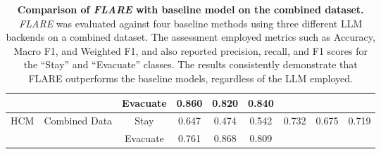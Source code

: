 \begin{table*}[t]
{\begin{tabular}{c|c|c|ccc|ccc}
&           & Evacuate & 0.860 & 0.820 & 0.840 &                     &                     &                     \\ 
\midrule
\multirow{2}{*}{HCM} 
& \multirow{2}{*}{Combined Data} 
  & Stay     & 0.647 & 0.474 & 0.542 & \multirow{2}{*}{0.732} & \multirow{2}{*}{0.675} & \multirow{2}{*}{0.719} \\
&           & Evacuate & 0.761 & 0.868 & 0.809 &                     &                     &                     \\ 
\bottomrule
\end{tabular}}
\caption{\textbf{Comparison of \emph{FLARE} with baseline model on the combined dataset.} \emph{FLARE} was evaluated against four baseline methods using three different LLM backends on a combined dataset. The assessment employed metrics such as Accuracy, Macro F1, and Weighted F1, and also reported precision, recall, and F1 scores for the “Stay” and “Evacuate” classes. The results consistently demonstrate that FLARE outperforms the baseline models, regardless of the LLM employed.}
\label{tab:same_results}
\vspace{-1em}
\end{table*}


